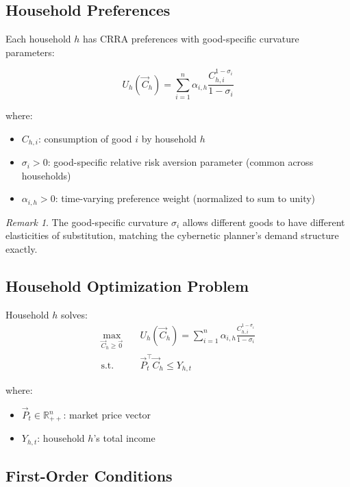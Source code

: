 \documentclass[12pt,a4paper]{article}
\theoremstyle{definition}
\theoremstyle{remark}
\newtheorem{remark}[theorem]{Remark}
\newcommand{\R}{\mathbb{R}}
\begin{document}
\subsection{Household Preferences}

Each household $h$ has CRRA preferences with good-specific curvature parameters:

\begin{equation}
    U_h(\vec{C}_h) = \sum_{i=1}^{n} \alpha_{i,h} \frac{C_{h,i}^{1-\sigma_i}}{1-\sigma_i}
\end{equation}

where:
\begin{itemize}
    \item $C_{h,i}$: consumption of good $i$ by household $h$
    \item $\sigma_i > 0$: good-specific relative risk aversion parameter (common across households)
    \item $\alpha_{i,h} > 0$: time-varying preference weight (normalized to sum to unity)
\end{itemize}

\begin{remark}
The good-specific curvature $\sigma_i$ allows different goods to have different elasticities of substitution, matching the cybernetic planner's demand structure exactly.
\end{remark}

\subsection{Household Optimization Problem}

Household $h$ solves:
\begin{equation}
\begin{aligned}
    \max_{\vec{C}_h \geq \vec{0}} \quad & U_h(\vec{C}_h) = \sum_{i=1}^{n} \alpha_{i,h} \frac{C_{h,i}^{1-\sigma_i}}{1-\sigma_i} \\
    \text{s.t.} \quad & \vec{P}_t^\top \vec{C}_h \leq Y_{h,t}
\end{aligned}
\end{equation}

where:
\begin{itemize}
    \item $\vec{P}_t \in \R^n_{++}$: market price vector
    \item $Y_{h,t}$: household $h$'s total income
\end{itemize}

\subsection{First-Order Conditions}
\end{document}
